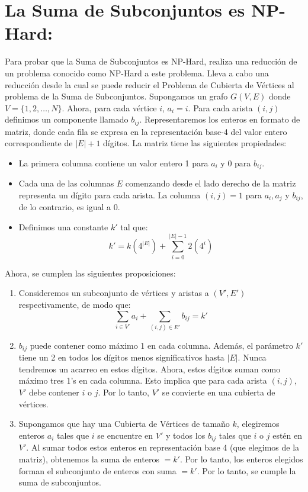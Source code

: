 \documentclass{article}
\begin{document}
\section*{La Suma de Subconjuntos es NP-Hard:}
Para probar que la Suma de Subconjuntos es NP-Hard, realiza una reducción de un problema conocido como NP-Hard a este problema.
Lleva a cabo una reducción desde la cual se puede reducir el Problema de Cubierta de Vértices al problema de la Suma de Subconjuntos. Supongamos un grafo \( G(V, E) \) donde \( V = \{1, 2, \ldots, N\} \). Ahora, para cada vértice \( i \), \( a_i = i \). Para cada arista \( (i, j) \) definimos un componente llamado \( b_{ij} \).
Representaremos los enteros en formato de matriz, donde cada fila se expresa en la representación base-4 del valor entero correspondiente de \( |E| + 1 \) dígitos.
La matriz tiene las siguientes propiedades:

\begin{itemize}
    \item La primera columna contiene un valor entero 1 para \( a_i \) y 0 para \( b_{ij} \).
    \item Cada una de las columnas \( E \) comenzando desde el lado derecho de la matriz representa un dígito para cada arista. La columna \( (i, j) = 1 \) para \( a_i, a_j \) y \( b_{ij} \), de lo contrario, es igual a 0.
    \item Definimos una constante \( k' \) tal que:
    \[
    k' = k(4^{|E|}) + \sum_{i=0}^{|E|-1} 2(4^{i})
    \]
\end{itemize}

Ahora, se cumplen las siguientes proposiciones:

\begin{enumerate}
    \item Consideremos un subconjunto de vértices y aristas a \( (V', E') \) respectivamente, de modo que:
    \[
    \sum_{i \in V'} a_i + \sum_{(i, j) \in E'} b_{ij} = k'
    \]
    \item \( b_{ij} \) puede contener como máximo 1 en cada columna. Además, el parámetro \( k' \) tiene un 2 en todos los dígitos menos significativos hasta \( |E| \). Nunca tendremos un acarreo en estos dígitos. Ahora, estos dígitos suman como máximo tres 1's en cada columna. Esto implica que para cada arista \( (i, j) \), \( V' \) debe contener \( i \) o \( j \). Por lo tanto, \( V' \) se convierte en una cubierta de vértices.
    \item Supongamos que hay una Cubierta de Vértices de tamaño \( k \), elegiremos enteros \( a_i \) tales que \( i \) se encuentre en \( V' \) y todos los \( b_{ij} \) tales que \( i \) o \( j \) estén en \( V' \). Al sumar todos estos enteros en representación base 4 (que elegimos de la matriz), obtenemos la suma de enteros \( = k' \). Por lo tanto, los enteros elegidos forman el subconjunto de enteros con suma \( = k' \). Por lo tanto, se cumple la suma de subconjuntos.
\end{enumerate}
\end{document}
